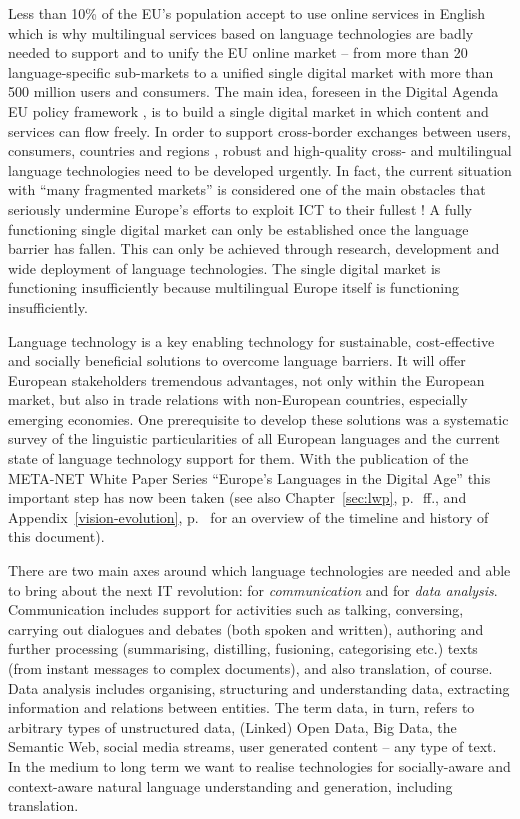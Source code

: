 \documentclass[10pt, plain]{../../metanetpaper}
\begin{document}
\begin{multicols}{2}
Less than 10\% of the EU's population accept to use online services in English which is why multilingual services based on language technologies are badly needed to support and to unify the EU online market -- from more than 20 language-specific sub-markets to a unified single digital market with more than 500 million users and consumers. The main idea, foreseen in the Digital Agenda EU policy framework \cite{DA2010}, is to build a single digital market in which content and services can flow freely. In order to support cross-border exchanges between users, consumers, countries and regions \cite{economist12}, robust and high-quality cross- and multilingual language technologies need to be developed urgently. In fact, the current situation with ``many fragmented markets'' is considered one of the main obstacles that seriously undermine Europe's efforts to exploit ICT to their fullest \cite{DA2010}! A fully functioning single digital market can only be established once the language barrier has fallen. This can only be achieved through research, development and wide deployment of language technologies. The single digital market is functioning insufficiently because multilingual Europe itself is functioning insufficiently.

Language technology is a key enabling technology for sustainable, cost-effective and socially beneficial solutions to overcome language barriers. It will offer European stakeholders tremendous advantages, not only within the European market, but also in trade relations with non-European countries, especially emerging economies. One prerequisite to develop these solutions was a systematic survey of the linguistic particularities of all European languages and the current state of language technology support for them. With the publication of the META-NET White Paper Series ``Europe's Languages in the Digital Age'' \cite{LWP2012} this important step has now been taken (see also Chapter~\ref{sec:lwp}, p.~\pageref{sec:lwp}\,ff., and Appendix~\ref{vision-evolution}, p.~\pageref{vision-evolution} for an overview of the timeline and history of this document).

There are two main axes around which language technologies are needed and able to bring about the next IT revolution: for \emph{communication} and for \emph{data analysis}. Communication includes support for activities such as talking, conversing, carrying out dialogues and debates (both spoken and written), authoring and further processing (summarising, distilling, fusioning, categorising etc.) texts (from instant messages to complex documents), and also translation, of course. Data analysis includes organising, structuring and understanding data, extracting information and relations between entities. The term data, in turn, refers to arbitrary types of unstructured data, (Linked) Open Data, Big Data, the Semantic Web, social media streams, user generated content -- any type of text. In the medium to long term we want to realise technologies for socially-aware and context-aware natural language understanding and generation, including translation.


\end{multicols}
\end{document}
